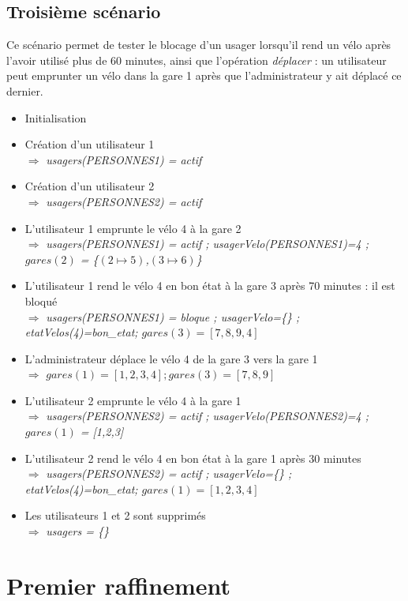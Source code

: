 \documentclass[12pt]{article}
\begin{document}
\subsection{Troisième scénario}
Ce scénario permet de tester le blocage d'un usager lorsqu'il rend un vélo après l'avoir utilisé plus de 60 minutes, ainsi que l'opération \textit{déplacer} : un utilisateur peut emprunter un vélo dans la gare 1 après que l'administrateur y ait déplacé ce dernier.
\begin{itemize}
  \item Initialisation
  \item Création d'un utilisateur 1 \\
  $\Rightarrow$ \textit{usagers(PERSONNES1) = actif}
  \item Création d'un utilisateur 2 \\
  $\Rightarrow$ \textit{usagers(PERSONNES2) = actif}
  \item L'utilisateur 1 emprunte le vélo 4 à la gare 2 \\
  $\Rightarrow$ \textit{usagers(PERSONNES1) = actif ; usagerVelo(PERSONNES1)=4 ; $gares(2)$ = \{$(2\mapsto5)$,$(3\mapsto6)$\}}
  \item L'utilisateur 1 rend le vélo 4 en bon état à la gare 3 après 70 minutes : il est bloqué \\
  $\Rightarrow$ \textit{usagers(PERSONNES1) = bloque ; usagerVelo=\{\} ; etatVelos(4)=bon\_etat; $gares(3) = [7,8,9,4]$}
  \item L'administrateur déplace le vélo 4 de la gare 3 vers la gare 1 \\
  $\Rightarrow$ \textit{$gares(1) = [1,2,3,4] ; gares(3) = [7,8,9]$}
  \item L'utilisateur 2 emprunte le vélo 4 à la gare 1 \\
  $\Rightarrow$ \textit{usagers(PERSONNES2) = actif ; usagerVelo(PERSONNES2)=4 ; $gares(1)$ = [1,2,3]}
  \item L'utilisateur 2 rend le vélo 4 en bon état à la gare 1 après 30 minutes \\
  $\Rightarrow$ \textit{usagers(PERSONNES2) = actif ; usagerVelo=\{\} ; etatVelos(4)=bon\_etat; $gares(1) = [1,2,3,4]$}
  \item Les utilisateurs 1 et 2 sont supprimés \\
  $\Rightarrow$ \textit{usagers = \{\}}
\end{itemize}
\newpage
\section{Premier raffinement}
\end{document}
